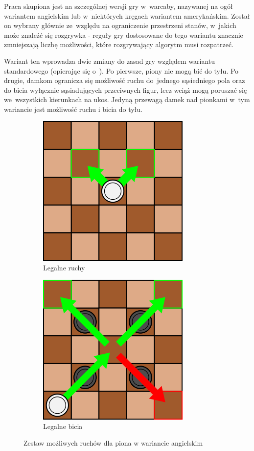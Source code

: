 \FloatBarrier

Praca skupiona jest na szczególnej wersji gry w~warcaby, nazywanej na ogół wariantem angielskim lub w~niektórych kręgach wariantem amerykańskim. Został on wybrany głównie ze~względu na ograniczenie przestrzeni stanów, w~jakich może znaleźć się rozgrywka - reguły gry dostosowane do tego wariantu znacznie zmniejszają liczbę możliwości, które rozgrywający algorytm musi rozpatrzeć.

Wariant ten wprowadza dwie zmiany do zasad gry względem wariantu standardowego (opierając się o~\cite{Gry}). Po pierwsze, piony nie mogą bić do tyłu. Po drugie, damkom ogranicza się możliwość ruchu do~jednego sąsiedniego pola oraz do bicia wyłącznie sąsiadujących przeciwnych figur, lecz wciąż mogą poruszać się we~wszystkich kierunkach na ukos. Jedyną przewagą damek nad pionkami w~tym wariancie jest możliwość ruchu i bicia do tyłu.

\begin{figure}
\centering
\begin{subfigure}{.5\textwidth}
  \centering
  \includegraphics[scale=.6]{graphics/warcaby_ruchyPionZwykle3.png}
  \caption{Legalne ruchy}
  \label{fig:sub1}
\end{subfigure}%
\begin{subfigure}{.5\textwidth}
  \centering
  \includegraphics[scale=.6]{graphics/warcaby_ruchyPionBicia.png}
  \caption{Legalne bicia}
  \label{fig:sub2}
\end{subfigure}
\caption{Zestaw możliwych ruchów dla piona w wariancie angielskim}
\label{fig:pion}
\end{figure}

